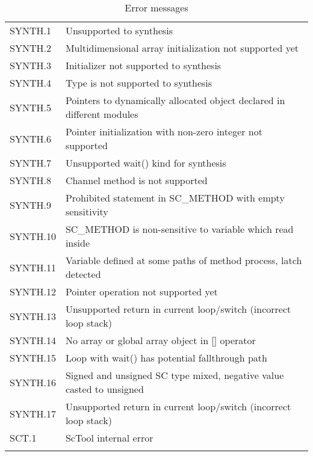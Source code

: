 \begin{longtable}{| p{} | p{} |}
SYNTH.1 & Unsupported to synthesis   \\
SYNTH.2 & Multidimensional array initialization not supported yet   \\
SYNTH.3 & Initializer not supported to synthesis \\
SYNTH.4 & Type is not supported to synthesis \\
SYNTH.5 & Pointers to dynamically allocated object declared in different modules \\
SYNTH.6 & Pointer initialization with non-zero integer not supported \\
SYNTH.7 & Unsupported wait() kind for synthesis \\
SYNTH.8 & Channel method is not supported \\
SYNTH.9 & Prohibited statement in SC\_METHOD with empty sensitivity \\
SYNTH.10 & SC\_METHOD is non-sensitive to variable which read inside \\
SYNTH.11 & Variable defined at some paths of method process, latch detected \\
SYNTH.12 & Pointer operation not supported yet \\
SYNTH.13 & Unsupported return in current loop/switch (incorrect loop stack) \\
SYNTH.14 & No array or global array object in [] operator \\
SYNTH.15 & Loop with wait() has potential fallthrough path \\
SYNTH.16 & Signed and unsigned SC type mixed, negative value casted to unsigned \\
SYNTH.17 & Unsupported return in current loop/switch (incorrect loop stack) \\
\hline

SCT.1 & ScTool internal error \\

\hline
\caption{Error messages}
\label{tab:errors}
\end{longtable}

